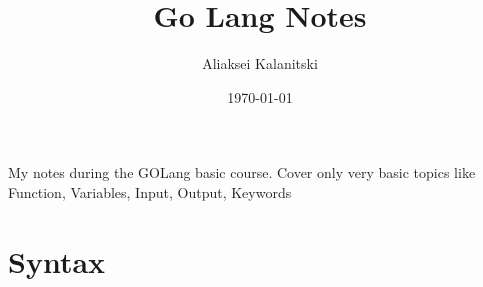 \documentclass[12pt]{article}
\begin{document}
\title{Go Lang Notes}
\author{Aliaksei Kalanitski}
\date{\today}
\maketitle

My notes during the GOLang basic course.
Cover only very basic topics like Function, Variables, Input, Output, Keywords

\begin{multicols}{2}
    \tableofcontents
\end{multicols}
\newpage


\section{Syntax}
\label{sec:syntax}
\end{document}
